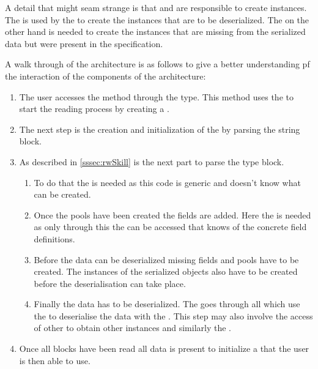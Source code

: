 \documentclass[thesis]{subfiles}
\begin{document}
  A detail that might seam strange is that \PoolProxy and \PoolMaker are responsible to create \UserFieldDeclarations instances.
  The \PartsMaker is used by the \Pool to create the \UserFieldDeclaration instances that are to be deserialized.
  The \PoolProxy on the other hand is needed to create the \UserFieldDeclaration instances that are missing from the serialized data but were present in the specification.


  A walk through of the architecture is as follows to give a better understanding pf the interaction of the components of the architecture:
  \begin{enumerate}
    \item
          The user accesses the \static \open method through the \SkillFile type.
          This method uses the \SkillFileBuilder to start the reading process by creating a \FileReader.
    \item
          The next step is the creation and initialization of the \StringPool by parsing the string block.
    \item
          As described in \autoref{sssec:rwSkill} is the next part to parse the type block.
          \begin{enumerate}
            \item
                  To do that the \PoolMaker is needed as this code is generic and doesn't know what \UserTypePools can be created.
            \item
                  Once the pools have been created the fields are added.
                  Here the \PoolProxy \trait is needed as only through this \trait the \PartsMaker can be accessed that knows of the concrete field definitions.
            \item
                  Before the data can be deserialized missing fields and pools have to be created.
                  The instances of the serialized objects also have to be created before the deserialisation can take place.
            \item
                  Finally the data has to be deserialized.
                  The \SkillFileBuilder goes through all \UserTypePools which use the \FieldDeclarations to deserialise the data with the \FileReader.
                  This step may also involve the access of other \UserTypePools to obtain other \UserType instances and similarly the \StringPool.
          \end{enumerate}
    \item Once all blocks have been read all data is present to initialize a \SkillFile that the user is then able to use.
  \end{enumerate}
\end{document}
